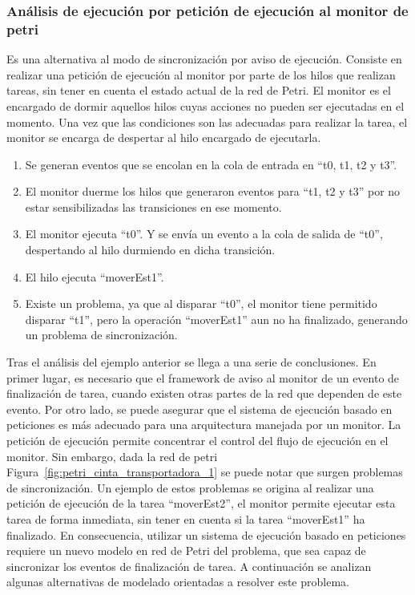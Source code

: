 \subsubsection{Análisis de ejecución por petición de ejecución al monitor de
petri}
 Es una alternativa al modo de sincronización por aviso de ejecución. Consiste
 en realizar una petición de ejecución al monitor por parte de los hilos que
 realizan tareas, sin tener en cuenta el estado actual de la red de Petri.
 El monitor es el encargado de dormir aquellos hilos cuyas acciones no
 pueden ser ejecutadas en el momento. Una vez que las condiciones son las
 adecuadas para realizar la tarea, el monitor se encarga de despertar al hilo
 encargado de ejecutarla.
\begin{enumerate}
    \item Se generan eventos que se encolan en la cola de entrada en “t0, t1,
    	t2 y t3”.
    \item El monitor duerme los hilos que generaron eventos para “t1, t2 y t3”
    	por no estar sensibilizadas las transiciones en ese momento.
    \item El monitor ejecuta “t0”. Y se envía un evento a la cola de salida de
    	“t0”, despertando al hilo durmiendo en dicha transición.
    \item El hilo ejecuta “moverEst1”.
    \item Existe un problema, ya que al disparar “t0”, el monitor tiene
    	permitido disparar “t1”, pero la operación “moverEst1” aun no ha
    	finalizado, generando un problema de sincronización.
\end{enumerate}
Tras el análisis  del ejemplo anterior se llega a una serie de
conclusiones. En primer lugar, es necesario que el framework de aviso al monitor
de un evento de finalización de tarea, cuando existen otras partes de la red que
dependen de este evento.
Por otro lado, se puede asegurar que el sistema de ejecución basado en
peticiones es más adecuado para una arquitectura manejada por un monitor. La
petición de ejecución permite concentrar el control del flujo de ejecución en
el monitor.
Sin embargo, dada la red de petri
Figura~\ref{fig:petri_cinta_transportadora_1} se puede notar que surgen
problemas de sincronización. Un ejemplo de estos problemas se origina al
realizar una petición de ejecución de la tarea “moverEst2”, el monitor permite
ejecutar esta tarea de forma inmediata, sin tener en cuenta si la tarea
``moverEst1'' ha finalizado. En consecuencia, utilizar un sistema de ejecución
basado en peticiones requiere un nuevo modelo en red de Petri del problema, que
sea capaz de sincronizar los eventos de finalización de tarea.
A continuación se analizan algunas alternativas de modelado orientadas a
resolver este problema.

